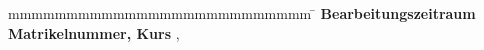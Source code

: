 \begin{titlepage}
\begin{spacing}{1.2}
	\begin{tabbing}
		mmmmmmmmmmmmmmmmmmmmmmmmmm \= \kill
		\textbf{Bearbeitungszeitraum} \> \documentPeriod \\
		\textbf{Matrikelnummer, Kurs} \> \matriculationNumber, \course \\
	\end{tabbing}
\end{spacing}
\end{titlepage}
